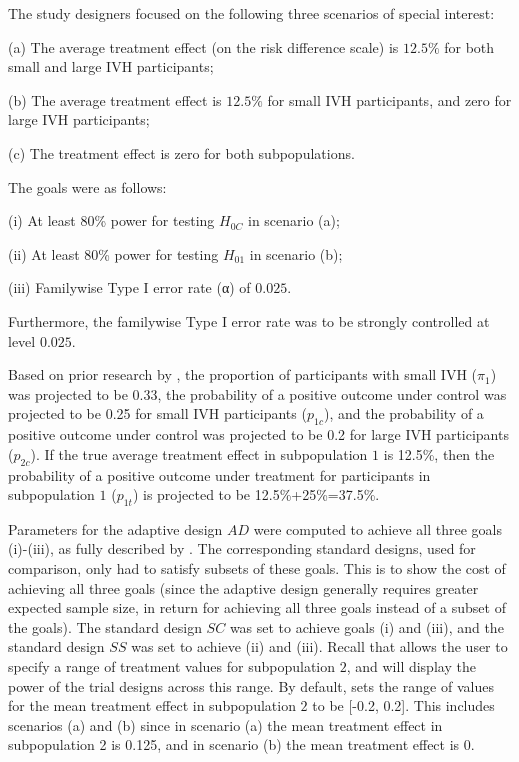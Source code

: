 \documentclass[article]{jss}
\begin{document}
The study designers focused on the following three scenarios of special interest:

\begin{description}
\item  (a) The average treatment effect (on the risk difference scale) is $12.5\%$ for both small and large IVH participants;
\item  (b) The average treatment effect is $12.5\%$ for small IVH participants, and zero for large IVH participants;
\item  (c) The treatment effect is zero for both subpopulations. 
\end{description}

The goals were as follows:

\begin{description}
\item  (i) At least 80\% power for testing $H_{0C}$ in scenario (a);
\item  (ii) At least 80\% power for testing $H_{01}$ in scenario (b);
\item  (iii) Familywise Type I error rate (α) of $0.025$.
\end{description}
Furthermore, the familywise Type I error rate was to be strongly controlled at level $0.025$.

Based on prior research by \cite{Hanley2012}, the proportion of participants with small IVH ($π_1$) was projected to be 0.33, the probability of a positive outcome under control was projected to be 0.25 for small IVH participants ($p_{1c}$), and the probability of a positive outcome under control was projected to be  0.2 for large IVH participants ($p_{2c}$).  If the true average treatment effect in subpopulation $1$ is 12.5\%, then the probability of a positive outcome under treatment for participants in subpopulation $1$ ($p_{1t}$) is projected to be 12.5\%+25\%=37.5\%.

Parameters for the adaptive design $AD$ were computed to achieve all three goals (i)-(iii), as fully described by \citep{Rosenblum2013AdaptMISTIE}. The corresponding standard designs, used for comparison, only had to satisfy subsets of these goals. This is to show the cost of achieving all three goals (since the adaptive design generally requires greater expected sample size, in return for achieving all three goals instead of a subset of the goals). 
The standard design $SC$ was set to achieve goals (i) and (iii), and the standard design $SS$ was set to achieve (ii) and (iii). Recall that  allows the user to specify a range of treatment values for subpopulation $2$, and will display the power of the trial designs across this range. By default,  sets the range of values for the mean treatment effect in subpopulation $2$ to be [-0.2, 0.2]. This includes scenarios (a) and (b) since in scenario (a) the mean treatment effect in subpopulation 2 is 0.125, and in scenario (b) the mean treatment effect is $0$. %
 
\end{document}

